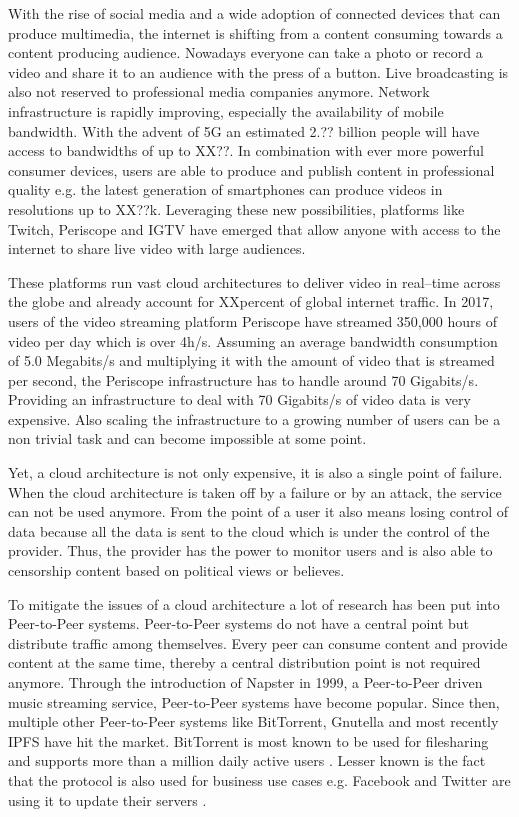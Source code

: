 With the rise of social media and a wide adoption of connected devices that can produce multimedia, the internet is shifting from a content consuming towards a content producing audience. Nowadays everyone can take a photo or record a video and share it to an audience with the press of a button. 
Live broadcasting is also not reserved to professional media companies anymore. Network infrastructure is rapidly improving, especially the availability of mobile bandwidth. With the advent of 5G an estimated 2.?? billion people will have access to bandwidths of up to XX??. In combination with ever more powerful consumer devices, users are able to produce and publish content in professional quality e.g. the latest generation of smartphones can produce videos in resolutions up to XX??k.
Leveraging these new possibilities, platforms like Twitch, Periscope and IGTV have emerged that allow anyone with access to the internet to share live video with large audiences.

These platforms run vast cloud architectures to deliver video in real–time across the globe and already account for XXpercent of global internet traffic.
In 2017, users of the video streaming platform Periscope have streamed 350,000 hours of video per day \cite{periscope-stats} which is over 4h/s. 
Assuming an average bandwidth consumption of 5.0 Megabits/s and multiplying it with the amount of video that is streamed per second, the Periscope infrastructure has to handle around 70 Gigabits/s.
Providing an infrastructure to deal with 70 Gigabits/s of video data is very expensive. Also scaling the infrastructure to a growing number of users can be a non trivial task and can become impossible at some point.

Yet, a cloud architecture is not only expensive, it is also a single point of failure. When the cloud architecture is taken off by a failure or by an attack, the service can not be used anymore.
From the point of a user it also means losing control of data because all the data is sent to the cloud which is under the control of the provider. Thus, the provider has the power to monitor users and is also able to censorship content based on political views or believes.

To mitigate the issues of a cloud architecture a lot of research has been put into Peer-to-Peer systems. Peer-to-Peer systems do not have a central point but distribute traffic among themselves. Every peer can consume content and provide content at the same time, thereby a central distribution point is not required anymore. Through the introduction of Napster in 1999, a Peer-to-Peer driven music streaming service, Peer-to-Peer systems have become popular. Since then, multiple other Peer-to-Peer systems like BitTorrent, Gnutella and most recently IPFS have hit the market. BitTorrent is most known to be used for filesharing and supports more than a million daily active users \cite{bittorrent-stats}. Lesser known is the fact that the protocol is also used for business use cases e.g. Facebook and Twitter are using it to update their servers \cite{bittorrent-facebook}.

